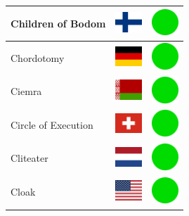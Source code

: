 \documentclass[12pt, a4paper, twoside]{report}
\begin{document}
\begin{center}
\begin{longtable}{|p{5cm}|p{2cm}|p{2cm}|}
 Children of Bodom                                          & \includegraphics[width=1cm]{../4x3/fi} &   \includegraphics[width=1cm]{../likes/y} \\ \hline
 Chordotomy                                                 & \includegraphics[width=1cm]{../4x3/de} &   \includegraphics[width=1cm]{../likes/y} \\ \hline
 Ciemra                                                     & \includegraphics[width=1cm]{../4x3/by} &   \includegraphics[width=1cm]{../likes/y} \\ \hline
 Circle of Execution                                        & \includegraphics[width=1cm]{../4x3/ch} &   \includegraphics[width=1cm]{../likes/y} \\ \hline
 Cliteater                                                  & \includegraphics[width=1cm]{../4x3/nl} &   \includegraphics[width=1cm]{../likes/y} \\ \hline
 Cloak                                                      & \includegraphics[width=1cm]{../4x3/us} &   \includegraphics[width=1cm]{../likes/y} \\ \hline

\end{longtable}
\end{center}
\end{document}
